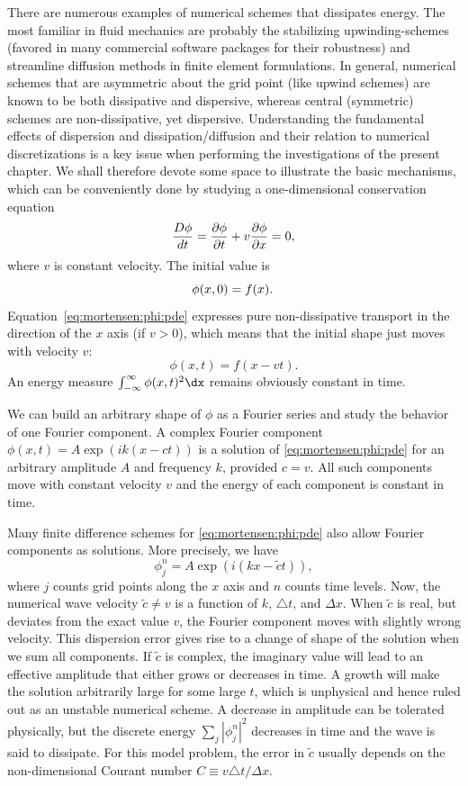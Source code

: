 There are numerous examples of numerical schemes that dissipates
energy. The most familiar in fluid mechanics are probably the
stabilizing upwinding-schemes (favored in many commercial software
packages for their robustness) and streamline diffusion methods in
finite element formulations. In general, numerical schemes that are
asymmetric about the grid point (like upwind schemes) are known to be
both dissipative and dispersive, whereas central (symmetric) schemes
are non-dissipative, yet dispersive. Understanding the fundamental
effects of dispersion and dissipation/diffusion and their relation to
numerical discretizations is a key issue when performing the
investigations of the present chapter. We shall therefore devote some
space to illustrate the basic mechanisms, which can be conveniently
done by studying a one-dimensional conservation equation
\begin{equation}
{D\phi\over dt} = {\partial\phi\over\partial t} + v{\partial\phi\over\partial x}
=0,
\label{eq:mortensen:phi:pde}
\end{equation}
where $v$ is constant velocity. The initial value is
\[ \phi(x,0)=f(x) . \thinspace\]
Equation~\eqref{eq:mortensen:phi:pde} expresses pure non-dissipative transport
in the direction of the $x$ axis (if $v>0$), which means that the initial
shape just moves with velocity $v$:
\[ \phi(x,t) = f(x-vt).\]
An energy measure $\int_{-\infty}^\infty\phi(x,t)^2\dx$ remains
obviously constant in time.

We can build an arbitrary shape of $\phi$ as a Fourier series and
study the behavior of one Fourier component.  A complex Fourier
component $\phi (x,t)=A\exp{(ik(x - ct))}$ is a solution of
\eqref{eq:mortensen:phi:pde} for an arbitrary amplitude $A$ and
frequency $k$, provided $c = v$.  All such components move with
constant velocity $v$ and the energy of each component is constant in
time.

Many finite difference schemes for \eqref{eq:mortensen:phi:pde} also allow
Fourier components as solutions. More precisely, we have
\[ \phi_j^n = A\exp{(i(kx - \tilde c t))},\]
where $j$ counts grid points along the $x$ axis and $n$ counts time
levels.  Now, the numerical wave velocity $\tilde c \neq v$ is a
function of $k$, $\triangle t$, and $\Delta x$.  When $\tilde c$ is
real, but deviates from the exact value $v$, the Fourier component
moves with slightly wrong velocity. This dispersion error gives rise
to a change of shape of the solution when we sum all components.  If
$\tilde c$ is complex, the imaginary value will lead to an effective
amplitude that either grows or decreases in time. A growth will make
the solution arbitrarily large for some large $t$, which is unphysical
and hence ruled out as an unstable numerical scheme.  A decrease in
amplitude can be tolerated physically, but the discrete energy $\sum_j
|\phi_j^n|^2$ decreases in time and the wave is said to dissipate.
For this model problem, the error in $\tilde c$ usually depends on the
non-dimensional Courant number $C\equiv v\triangle t/\Delta x$.

